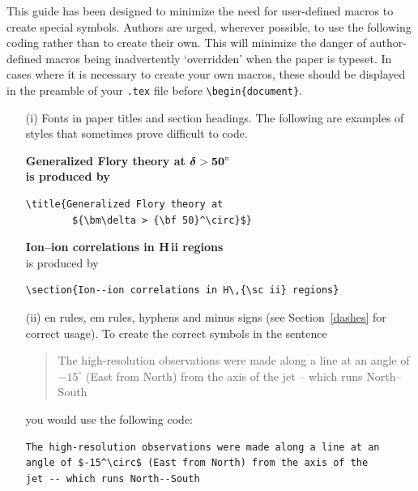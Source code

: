 \documentclass{tPRS2e}
\begin{document}
This guide has been designed to minimize the need for user-defined macros to create special symbols. Authors
are urged, wherever possible, to use the following coding rather than to create their own. This will minimize
the danger of author-defined macros being inadvertently `overridden' when the paper is typeset. In cases where it is necessary to create your own macros,
these should be displayed in the preamble of your \verb".tex" file before \verb"\begin{document}".

\begin{enumerate}
\item[(i)] Fonts in paper titles and section headings. The following are examples
of styles that sometimes prove difficult to code.
\bigskip

\bf{\noindent Generalized Flory theory at ${\bm\delta >
{\bf 50}^\circ}$}\\

    \noindent\normalfont is produced by
\begin{verbatim}
\title{Generalized Flory theory at
        ${\bm\delta > {\bf 50}^\circ}$}
\end{verbatim}
\bigskip

{\bf{\noindent Ion--ion correlations in H\,{\sc ii} regions}}\\

\noindent\normalfont is produced by
\begin{verbatim}
\section{Ion--ion correlations in H\,{\sc ii} regions}
\end{verbatim}


\item[(ii)] en rules, em rules, hyphens and minus signs (see Section~\ref{dashes} for
correct usage). To create the correct symbols in the sentence
\begin{quote}
The high-resolution observations were made along a line at an
angle of $-15^\circ$ (East from North) from the axis of the
jet -- which runs North--South
\end{quote}
you would use the following code:
\begin{verbatim}
The high-resolution observations were made along a line at an
angle of $-15^\circ$ (East from North) from the axis of the
jet -- which runs North--South
\end{verbatim}


\end{enumerate}
\end{document}
